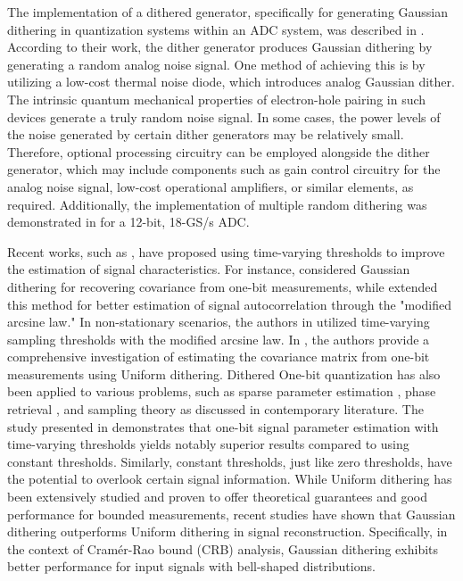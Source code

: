\documentclass[12pt,draftcls,onecolumn]{IEEEtran}
\begin{document}
The implementation of a dithered generator, specifically for generating Gaussian dithering in quantization systems within an ADC system, was described in \cite{robinson2019analog}. According to their work, the dither generator produces Gaussian dithering by generating a random analog noise signal. One method of achieving this is by utilizing a low-cost thermal noise diode, which introduces analog Gaussian dither. The intrinsic quantum mechanical properties of electron-hole pairing in such devices generate a truly random noise signal. In some cases, the power levels of the noise generated by certain dither generators may be relatively small. Therefore, optional processing circuitry can be employed alongside the dither generator, which may include components such as gain control circuitry for the analog noise signal, low-cost operational amplifiers, or similar elements, as required. Additionally, the implementation of multiple random dithering was demonstrated in \cite{ali2020background} for a 12-bit, 18-GS/s ADC. 

Recent works, such as \cite{qian2017admm,gianelli2016one,wang2017angular,xi2020gridless,xu2020quantized}, have proposed using time-varying thresholds to improve the estimation of signal characteristics. For instance, \cite{eamaz2021modified} considered Gaussian dithering for recovering covariance from one-bit measurements, while \cite{eamaz2023covariance} extended this method for better estimation of signal autocorrelation through the "modified arcsine law." In non-stationary scenarios, the authors in \cite{eamaz2022covariance} utilized time-varying sampling thresholds with the modified arcsine law. In \cite{dirksen2022covariance}, the authors provide a comprehensive investigation of estimating the covariance matrix from one-bit measurements using Uniform dithering. Dithered One-bit quantization has also been applied to various problems, such as sparse parameter estimation \cite{gianelli2016one,dabeer2006signal,thrampoulidis2020generalized}, phase retrieval \cite{eamaz2022phase}, and sampling theory \cite{eamaz2022uno} as discussed in contemporary literature. The study presented in \cite{eamaz2022covariance} demonstrates that one-bit signal parameter estimation with time-varying thresholds yields notably superior results compared to using constant thresholds. Similarly, constant thresholds, just like zero thresholds, have the potential to overlook certain signal information. 
While Uniform dithering has been extensively studied and proven to offer theoretical guarantees and good performance for bounded measurements, recent studies \cite{xi2020gridless,eamaz2023covariance} have shown that Gaussian dithering outperforms Uniform dithering in signal reconstruction. Specifically, in the context of Cram\'er-Rao bound (CRB) analysis, Gaussian dithering exhibits better performance for input signals with bell-shaped distributions.
\end{document}
